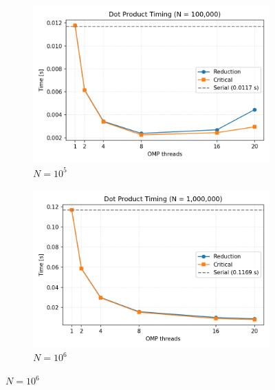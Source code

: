 \begin{figure}[H]
    \centering
    \begin{subfigure}{0.45\textwidth}
        \centering
        \includegraphics[width=\linewidth]{../Skeleton_codes/dotProduct/plots/dotprod_N100000.png}
        \caption{$N = 10^5$}
        \label{fig:dotprod_n1e5}
    \end{subfigure}
    \hfill
    \begin{subfigure}{0.45\textwidth}
        \centering
        \includegraphics[width=\linewidth]{../Skeleton_codes/dotProduct/plots/dotprod_N1000000.png}
        \caption{$N = 10^6$}
        \label{fig:dotprod_n1e6}
    \end{subfigure}

    \vspace{1em}


\end{figure}
